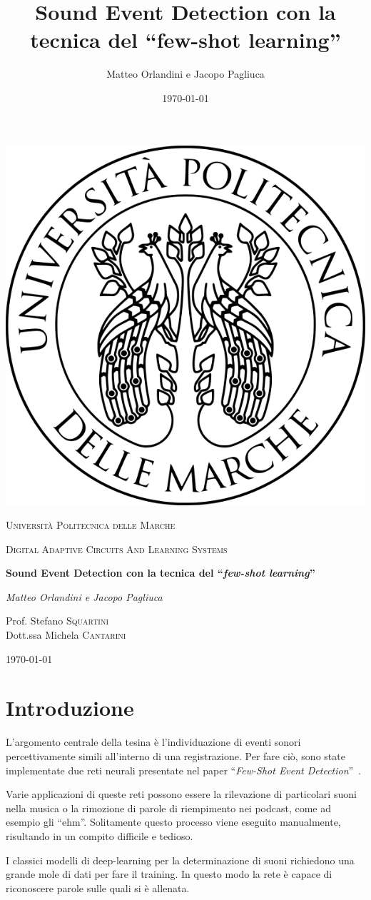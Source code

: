 \documentclass[12pt,a4paper,titlepage]{article}
\title{Sound Event Detection con la tecnica del ``few-shot learning''}
\author{Matteo Orlandini e Jacopo Pagliuca}
\date{\today}
\begin{document}
\begin{titlepage}
	
	\centering
	\includegraphics[width=.2\textwidth]{Immagini/univpmlogo}\par\vspace{1cm}
	{\scshape\LARGE Università Politecnica delle Marche\par}
	\vspace{1cm}
	{\scshape\Large Digital Adaptive Circuits And Learning Systems\par}
	\vspace{1.5cm}
	{\huge\bfseries Sound Event Detection con la tecnica del  ``\textit{few-shot learning}''  \par}
	\vspace{2cm}
	{\Large\itshape Matteo Orlandini e Jacopo Pagliuca\par}
	\vfill
	Prof. Stefano \textsc{Squartini}\\
	Dott.ssa Michela \textsc{Cantarini}
	
	\vfill
	
	{\large \today\par}
\end{titlepage}

\thispagestyle{empty}
\tableofcontents
\clearpage

\setcounter{page}{1}

\section{Introduzione}
\label{section:Introduzione}
L'argomento centrale della tesina è l'individuazione di eventi sonori percettivamente simili all'interno di una registrazione. Per fare ciò, sono state implementate due reti neurali presentate nel paper ``\textit{Few-Shot Event Detection}''~\cite{salamon:Few-Shot}.

Varie applicazioni di queste reti possono essere la rilevazione di particolari suoni nella musica o la rimozione di parole di riempimento nei podcast, come ad esempio gli ``ehm''. Solitamente questo processo viene eseguito manualmente, risultando in un compito difficile e tedioso.

I classici modelli di deep-learning per la determinazione di suoni richiedono una grande mole di dati per fare il training. In questo modo la rete è capace di riconoscere parole sulle quali si è allenata.
\end{document}

